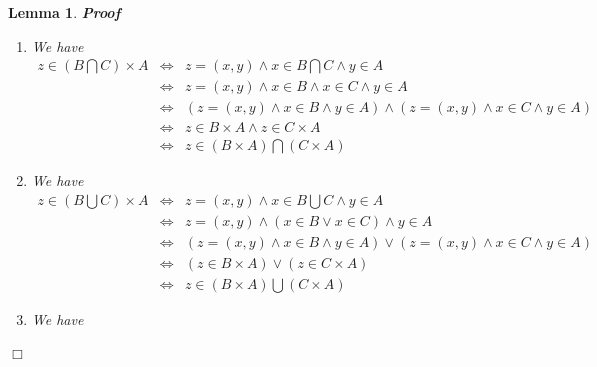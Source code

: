 \documentclass{book}
\newcommand{\Leftrightarrowlim}{\mathop{\leftrightarrow}\limits}
\newenvironment{proof}{\noindent\textbf{Proof\ }}{\hspace*{\fill}$\Box$\medskip}
\newtheorem{lemma}{Lemma}
\begin{document}
{{\begin{lemma}
\begin{proof}
\begin{enumerate}
\begin{eqnarray*}
        (z = (x', y') \wedge x' \in C \wedge y' \in D)\\
        & \Leftrightarrowlim_{(x, y) = z = (x', y') \Rightarrow x = x', y =
        y'} & z = (x, y) \wedge x \in A \wedge y \in B \wedge x \in C \wedge y
        \in D\\
        & \Leftrightarrow & z = (x, y) \wedge (x \in A \wedge x \in C) \wedge
        (y \in B \wedge y \in D)\\
        & \Leftrightarrow & z = (x, y) \wedge \left( x \in A \bigcap C
        \right) \wedge \left( y \in B \bigcap D \right)\\
        & \Leftrightarrow & z \in \left( A \bigcap C \right) \times \left( B
        \bigcap D \right)
      \end{eqnarray*}
      \item We have
      \begin{eqnarray*}
        z \in \left( B \bigcap C \right) \times A & \Leftrightarrow & z = (x,
        y) \wedge x \in B \bigcap C \wedge y \in A\\
        & \Leftrightarrow & z = (x, y) \wedge x \in B \wedge x \in C \wedge y
        \in A\\
        & \Leftrightarrow & (z = (x, y) \wedge x \in B \wedge y \in A) \wedge
        (z = (x, y) \wedge x \in C \wedge y \in A)\\
        & \Leftrightarrow & z \in B \times A \wedge z \in C \times A\\
        & \Leftrightarrow & z \in (B \times A) \bigcap (C \times A)
      \end{eqnarray*}
      \item We have
      \begin{eqnarray*}
        z \in \left( B \bigcup C \right) \times A & \Leftrightarrow & z = (x,
        y) \wedge x \in B \bigcup C \wedge y \in A\\
        & \Leftrightarrow & z = (x, y) \wedge (x \in B \vee x \in C) \wedge y
        \in A\\
        & \Leftrightarrow & (z = (x, y) \wedge x \in B \wedge y \in A) \vee
        (z = (x, y) \wedge x \in C \wedge y \in A)\\
        & \Leftrightarrow & (z \in B \times A) \vee (z \in C \times A)\\
        & \Leftrightarrow & z \in (B \times A) \bigcup (C \times A)
      \end{eqnarray*}
      \item We have
      \begin{eqnarray*}

\end{eqnarray*}
\end{enumerate}
\end{proof}
\end{lemma}}}
\end{document}
